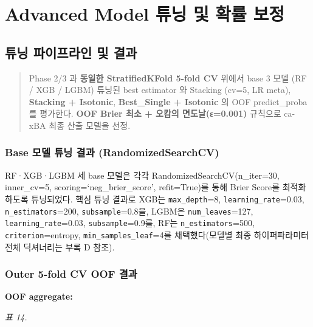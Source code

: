 \documentclass[
  11.5pt,
]{article}
\begin{document}
\section{Advanced Model 튜닝 및 확률
보정}\label{advanced-model-uxd29cuxb2dd-uxbc0f-uxd655uxb960-uxbcf4uxc815}

\subsection{튜닝 파이프라인 및
결과}\label{uxd29cuxb2dd-uxd30cuxc774uxd504uxb77cuxc778-uxbc0f-uxacb0uxacfc}

\begin{quote}
Phase 2/3 과 \textbf{동일한 StratifiedKFold 5-fold CV} 위에서 base 3
모델 (RF / XGB / LGBM) 튜닝된 best estimator 와 Stacking (cv=5, LR
meta), \textbf{Stacking + Isotonic}, \textbf{Best\_Single + Isotonic} 의
OOF predict\_proba 를 평가한다. \textbf{OOF Brier 최소 + 오캄의
면도날(ε=0.001)} 규칙으로 ca-xBA 최종 산출 모델을 선정.
\end{quote}

\subsubsection{Base 모델 튜닝 결과
(RandomizedSearchCV)}\label{base-uxbaa8uxb378-uxd29cuxb2dd-uxacb0uxacfc-randomizedsearchcv}

RF·XGB·LGBM 세 base 모델은 각각 RandomizedSearchCV(n\_iter=30,
inner\_cv=5, scoring=`neg\_brier\_score', refit=True)를 통해 Brier
Score를 최적화하도록 튜닝되었다. 핵심 튜닝 결과로 XGB는
\texttt{max\_depth}=8, \texttt{learning\_rate}=0.03,
\texttt{n\_estimators}=200, \texttt{subsample}=0.8을, LGBM은
\texttt{num\_leaves}=127, \texttt{learning\_rate}=0.03,
\texttt{subsample}=0.9를, RF는 \texttt{n\_estimators}=500,
\texttt{criterion}=entropy, \texttt{min\_samples\_leaf}=4를
채택했다(모델별 최종 하이퍼파라미터 전체 딕셔너리는 부록 D 참조).

\subsubsection{Outer 5-fold CV OOF
결과}\label{outer-5-fold-cv-oof-uxacb0uxacfc}

\textbf{OOF aggregate:}

\emph{표 14.}
\end{document}
